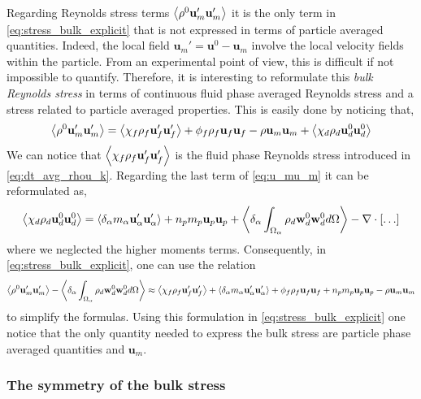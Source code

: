 {Regarding Reynolds stress terms $\left<\rho^0 \textbf{u}'_m\textbf{u}'_m\right>$ it is the only term in \ref{eq:stress_bulk_explicit} that is not expressed in terms of particle averaged quantities. 
Indeed, the local field $\textbf{u}_m' = \textbf{u}^0 - \textbf{u}_m$ involve the local velocity fields within the particle.
From an experimental point of view, this is difficult if not impossible to quantify.  
Therefore, it is interesting to reformulate this \textit{bulk Reynolds stress} in terms of continuous fluid phase averaged Reynolds stress and a stress related to particle averaged properties. 
This is easily done by noticing that, 
\begin{equation*}
    \left<\rho^0 \textbf{u}'_m\textbf{u}'_m\right>
    = 
    \left<\chi_f \rho_f \textbf{u}_f'\textbf{u}_f'\right>
    + \phi_f \rho_f \textbf{u}_f\textbf{u}_f
    - \rho \textbf{u}_m\textbf{u}_m
    + \left<\chi_d \rho_d \textbf{u}_d^0\textbf{u}_d^0\right>
    \label{eq:u_mu_m}
\end{equation*}
We can notice that $\left<\chi_f \rho_f \textbf{u}_f'\textbf{u}_f'\right>$ is the fluid phase Reynolds stress introduced in \ref{eq:dt_avg_rhou_k}. 
Regarding the last term of \ref{eq:u_mu_m} it can be reformulated as, 
\begin{equation*}
    \left<\chi_d \rho_d \textbf{u}_d^0\textbf{u}_d^0\right>
    = 
    \left<\delta_\alpha  m_\alpha \textbf{u}_\alpha' \textbf{u}_\alpha' \right>
    + n_p m_p \textbf{u}_p\textbf{u}_p
    + \left<\delta_\alpha \int_{\Omega_\alpha} \rho_d \textbf{w}_d^0 \textbf{w}_d^0 d\Omega\right>
    - \mathbf{\nabla}\cdot [\ldots]
\end{equation*}
where we neglected the higher moments terms. 
Consequently, in \ref{eq:stress_bulk_explicit}, one can use the relation 
\begin{equation*}
    \left<\rho^0 \textbf{u}'_m\textbf{u}'_m\right>
    - \left<\delta_\alpha \int_{\Omega_\alpha} \rho_d \textbf{w}_d^0 \textbf{w}_d^0 d\Omega\right>
    \approx 
    \left<\chi_f \rho_f \textbf{u}_f'\textbf{u}_f'\right>
    + \left<\delta_\alpha  m_\alpha \textbf{u}_\alpha'\textbf{u}_\alpha'\right>
    + \phi_f \rho_f \textbf{u}_f\textbf{u}_f
    + n_p m_p \textbf{u}_p\textbf{u}_p
    - \rho \textbf{u}_m\textbf{u}_m
\end{equation*}
to simplify the formulas. 
Using this formulation in \ref{eq:stress_bulk_explicit} one notice that the only quantity needed to express the bulk stress are particle phase averaged quantities and $\textbf{u}_m$. 
}
\subsubsection{The symmetry of the bulk stress}

